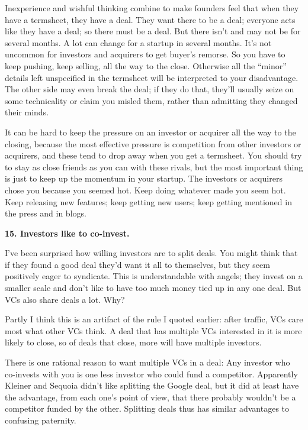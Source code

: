 \documentclass[12pt]{book}
\begin{document}
Inexperience and wishful thinking combine to make founders feel that
when they have a termsheet, they have a deal. They want there to be a
deal; everyone acts like they have a deal; so there must be a deal. But
there isn't and may not be for several months. A lot can change for a
startup in several months. It's not uncommon for investors and acquirers
to get buyer's remorse. So you have to keep pushing, keep selling, all
the way to the close. Otherwise all the ``minor'' details left
unspecified in the termsheet will be interpreted to your disadvantage.
The other side may even break the deal; if they do that, they'll usually
seize on some technicality or claim you misled them, rather than
admitting they changed their minds.

It can be hard to keep the pressure on an investor or acquirer all the
way to the closing, because the most effective pressure is competition
from other investors or acquirers, and these tend to drop away when you
get a termsheet. You should try to stay as close friends as you can with
these rivals, but the most important thing is just to keep up the
momentum in your startup. The investors or acquirers chose you because
you seemed hot. Keep doing whatever made you seem hot. Keep releasing
new features; keep getting new users; keep getting mentioned in the
press and in blogs.

\textbf{15. Investors like to co-invest.}

I've been surprised how willing investors are to split deals. You might
think that if they found a good deal they'd want it all to themselves,
but they seem positively eager to syndicate. This is understandable with
angels; they invest on a smaller scale and don't like to have too much
money tied up in any one deal. But VCs also share deals a lot. Why?

Partly I think this is an artifact of the rule I quoted earlier: after
traffic, VCs care most what other VCs think. A deal that has multiple
VCs interested in it is more likely to close, so of deals that close,
more will have multiple investors.

There is one rational reason to want multiple VCs in a deal: Any
investor who co-invests with you is one less investor who could fund a
competitor. Apparently Kleiner and Sequoia didn't like splitting the
Google deal, but it did at least have the advantage, from each one's
point of view, that there probably wouldn't be a competitor funded by
the other. Splitting deals thus has similar advantages to confusing
paternity.
\end{document}
